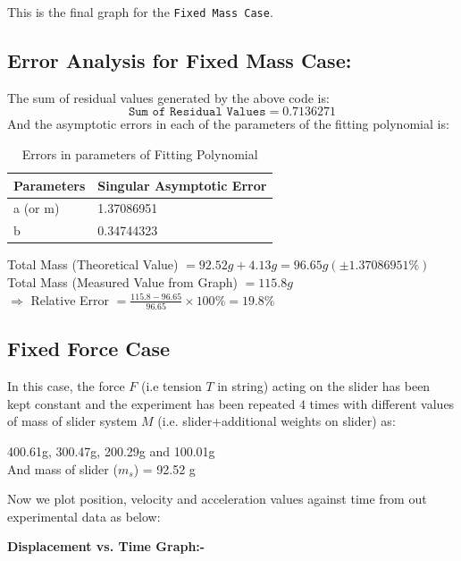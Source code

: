 \documentclass{article}
\begin{document}
 	This is the final graph for the \texttt{Fixed Mass Case}.\\
 	
 	\subsection{Error Analysis for Fixed Mass Case: }
 	
 	The sum of residual values generated by the above code is:
 	$$\texttt{Sum\ of\ Residual\ Values} = 0.7136271$$
 	And the asymptotic errors in each of the parameters of the fitting polynomial is:
 	\begin{table}[!ht]
 		\centering
 		\begin{tabular}{|l|l|}
 			\hline
 			Parameters & Singular Asymptotic Error \\ \hline
 			a (or m) & 1.37086951 \\ \hline
 			b & 0.34744323 \\ \hline
 		\end{tabular}
 		\caption{Errors in parameters of Fitting Polynomial}
 		\label{error}
 	\end{table}
 
 	Total Mass (Theoretical Value) $= 92.52g + 4.13g = 96.65g (\pm 1.37086951\%)$\\
 	Total Mass (Measured Value from Graph) $= 115.8g$\\
 	$\Rightarrow$ Relative Error $= \frac{115.8-96.65}{96.65} \times 100\% = 19.8\%$
 	
 	\subsection{Fixed Force Case}
 	
 	In this case, the force $F$ (i.e tension $T$ in 
 	string) acting on the slider has been kept constant and the 
 	experiment has been repeated $4$ times with different values of mass 
 	of slider system $M$ (i.e. slider+additional weights on slider) as:\\
 	\begin{center}
 		400.61g, 300.47g, 200.29g and 100.01g \\
 		And mass of slider ($m_s$) = 92.52 g 
 	\end{center}
 
 	Now we plot position, velocity and acceleration values against time from 
 	out experimental data as below:
 	
 	\textbf{Displacement vs. Time Graph:-}
 	
\end{document}
